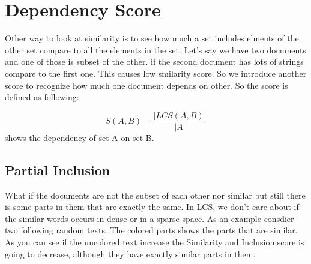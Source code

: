 \section{Dependency Score}
Other way to look at similarity is to see how much a set 
includes elments of the other set compare to all the elements
in the set. Let's say we have two documents and one of those is 
subset of the other. if the second document has lots of strings compare
to the first one. This causes low smilarity score. So we introduce another 
score to recognize how much one document depends on other. So the score
is defined as following:

\begin{equation}
\label{eq:inc-s}
  S(A,B) = \frac{|LCS(A,B)|}{|A|} 
\end{equation}
shows the dependency of set A on set B.
\subsection{Partial Inclusion}
What if the documents are not the subset of each other nor similar but
still there is some parts in them that are exactly the same. In LCS, we 
don't care about if the similar words occurs in dense or in a sparse
space. As an example consdier two following random texts. The colored parts
shows the parts that are similar. As you can see if the uncolored text increase
the Similarity and Inclusion score is going to decrease, although they have
exactly similar parts in them. 

